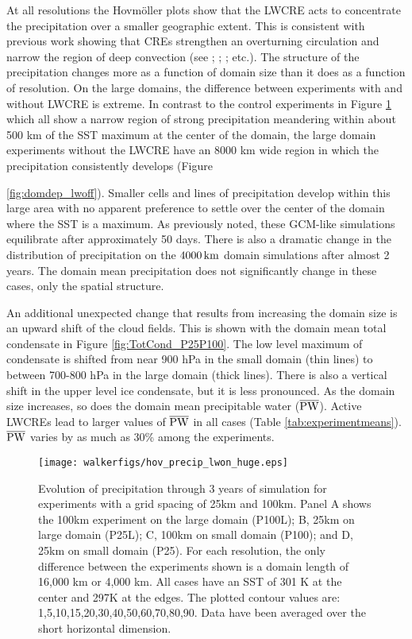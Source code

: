 \documentclass[draft]{agujournal2019}
\begin{document}
At all resolutions the Hovm{\"o}ller plots show that the LWCRE acts to concentrate the 
precipitation over a smaller geographic extent.   This is consistent with previous work showing that CREs 
strengthen an overturning circulation and narrow the region of deep convection (see ; 
; ;   etc.).  The structure of the precipitation changes more 
as a function of domain size than it does as a function of resolution. 
On the large domains, the difference between experiments with and without LWCRE is extreme.  
In contrast to the control experiments in Figure \ref{fig:domdep} which all show a narrow region of strong 
precipitation meandering within about 500 km of the SST maximum at the center of the domain,  the large domain experiments 
without the LWCRE have an 8000 km wide region in which the precipitation consistently develops (Figure {\ref{fig:domdep_lwoff}).  
Smaller cells and lines of precipitation develop within this large area with no apparent preference to settle
over the center of the domain where the SST is a maximum.  As previously noted, 
these GCM-like simulations equilibrate after approximately 50 days.  There is also a dramatic change in 
the distribution of precipitation on the $4000\, \rm{km}$ domain simulations after almost 2 years.   The domain mean 
precipitation does not significantly change in these cases, only the spatial structure. 

An additional unexpected change that results from increasing the domain size is an upward shift of the cloud fields.  This is 
shown with the domain mean total condensate in Figure \ref{fig:TotCond_P25P100}.  The  low level maximum of 
condensate is shifted from near 900 hPa in the small domain (thin lines) to between 700-800 hPa in 
the large domain (thick lines).  There is also a vertical shift in the upper level ice condensate, but it is less
pronounced.  
As the domain size increases, so does the domain mean precipitable water ($\overline{\rm{PW}}$).  Active LWCREs lead
to larger values of $\overline{\rm{PW}}$ in all cases (Table \ref{tab:experimentmeans}).  
$\overline{\rm{PW}}$ varies by as much as 30\% among the experiments.  


\begin{figure}
  \texttt{[image: walkerfigs/hov\_precip\_lwon\_huge.eps]}
  \caption{Evolution of precipitation through 3 years of simulation for experiments with a grid spacing of
  25km and 100km.  Panel A shows the 100km experiment on the large domain (P100L); 
  B, 25km on large domain (P25L); C, 100km on small domain (P100); and D, 25km on small domain 
  (P25).  For each resolution, the only difference between the experiments shown is a domain length of 
  16,000 km or 4,000 km.  All cases have an SST of 301 K at the center and 297K at the edges.  
  The plotted contour values are: 1,5,10,15,20,30,40,50,60,70,80,90.  Data have been averaged over the short horizontal dimension.}
  \label{fig:domdep}
\end{figure}

}
\end{document}
